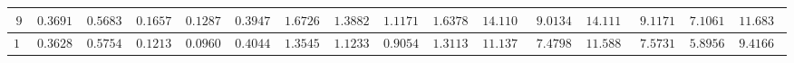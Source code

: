 \begin{table}[]
\begin{tabular}{|c|c|c|c|c|c|c|c|c|c|c|c|c|c|c|c}
$9$          & $0.369100$                                                        & $0.568300$                                                        & $0.165700$                                                          & $0.128700$                                                           & $0.394700$                                                              & $1.672600$                                                        & $1.388200$                                                          & $1.117100$                                                           & $1.637800$                                                              & $14.110400$                                                       & $9.013400$                                                          & $14.111910$                                                       & $9.117170$                                                          & $7.106180$                                                           & \multicolumn{1}{c|}{$11.683620$}                                                             \\ \hline
$10$         & $0.362800$                                                        & $0.575400$                                                        & $0.121300$                                                          & $0.096000$                                                           & $0.404400$                                                              & $1.354500$                                                        & $1.123300$                                                          & $0.905400$                                                           & $1.311300$                                                              & $11.137700$                                                       & $7.479800$                                                          & $11.588780$                                                       & $7.573180$                                                          & $5.895650$                                                           & \multicolumn{1}{c|}{$9.416650$}                                                              \\ \hline

\end{tabular}
\end{table}
